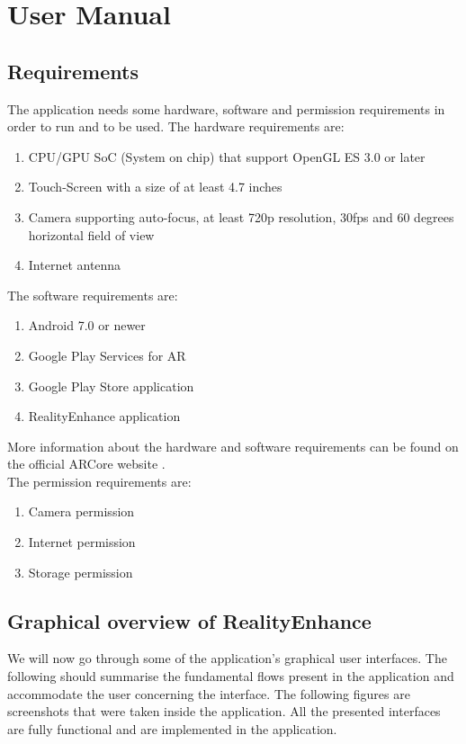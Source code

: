 \chapter{User Manual}\label{cap:evaluation}

\section{Requirements}
The application needs some hardware, software and permission requirements in order to run and to be used. The hardware requirements are:
\begin{enumerate}
    \item CPU/GPU SoC (System on chip) that support OpenGL ES 3.0 or later
    \item Touch-Screen with a size of at least 4.7 inches
    \item Camera supporting auto-focus, at least 720p resolution, 30fps and 60 degrees horizontal field of view
    \item Internet antenna
\end{enumerate}
The software requirements are:
\begin{enumerate}
    \item Android 7.0 or newer
    \item Google Play Services for AR
    \item Google Play Store application
    \item RealityEnhance application
\end{enumerate}

More information about the hardware and software requirements can be found on the official ARCore website \cite{ARCoreDevices}.
\\
The permission requirements are:
\begin{enumerate}
    \item Camera permission
    \item Internet permission
    \item Storage permission
\end{enumerate}

\section{Graphical overview of RealityEnhance}
We will now go through some of the application's graphical user interfaces. The following should summarise the fundamental flows present in the application and accommodate the user concerning the interface. The following figures are screenshots that were taken inside the application. All the presented interfaces are fully functional and are implemented in the application.

